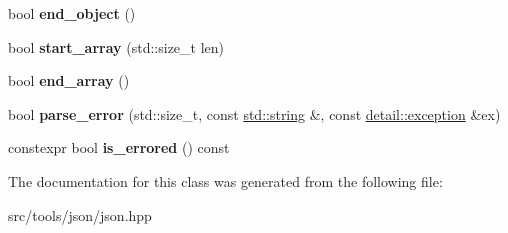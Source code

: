 \begin{DoxyCompactItemize}
\mbox{\label{classnlohmann_1_1detail_1_1json__sax__dom__callback__parser_ae75d313d6d1b9c29508e740a10fefa18}} 
bool {\bfseries end\+\_\+object} ()
\item 
\mbox{\label{classnlohmann_1_1detail_1_1json__sax__dom__callback__parser_a5255b98ba8282e3625968f91cff9d3d0}} 
bool {\bfseries start\+\_\+array} (std\+::size\+\_\+t len)
\item 
\mbox{\label{classnlohmann_1_1detail_1_1json__sax__dom__callback__parser_aa64e7a650952174037d32028de582c12}} 
bool {\bfseries end\+\_\+array} ()
\item 
\mbox{\label{classnlohmann_1_1detail_1_1json__sax__dom__callback__parser_aac6e64f0b59c9150cde974e182d5ecab}} 
bool {\bfseries parse\+\_\+error} (std\+::size\+\_\+t, const \hyperlink{namespacenlohmann_1_1detail_a1ed8fc6239da25abcaf681d30ace4985ab45cffe084dd3d20d928bee85e7b0f21}{std\+::string} \&, const \hyperlink{classnlohmann_1_1detail_1_1exception}{detail\+::exception} \&ex)
\item 
\mbox{\label{classnlohmann_1_1detail_1_1json__sax__dom__callback__parser_a167fd9bf385d3d08bcbbba8a927c0eff}} 
constexpr bool {\bfseries is\+\_\+errored} () const
\end{DoxyCompactItemize}


The documentation for this class was generated from the following file\+:\begin{DoxyCompactItemize}
\item 
src/tools/json/json.\+hpp\end{DoxyCompactItemize}

